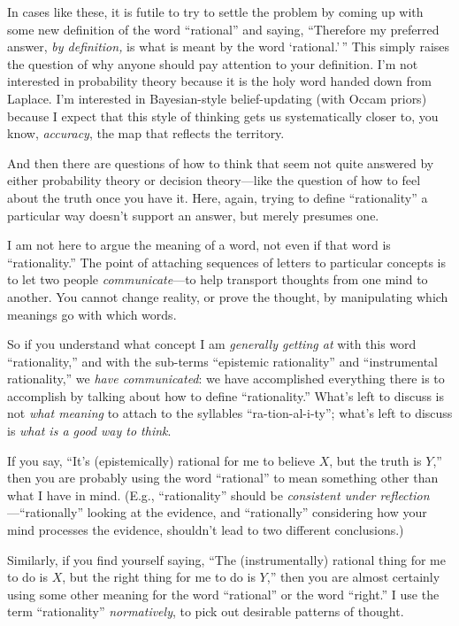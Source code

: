 {
 In cases like these, it is futile to try to settle the problem by
coming up with some new definition of the word
``rational'' and saying,
``Therefore my preferred answer, \textit{by
definition,} is what is meant by the word
`rational.'\,'' This
simply raises the question of why anyone should pay attention to your
definition. I'm not interested in probability theory
because it is the holy word handed down from Laplace.
I'm interested in Bayesian-style belief-updating (with
Occam priors) because I expect that this style of thinking gets us
systematically closer to, you know, \textit{accuracy}, the map that
reflects the territory.}

{
 And then there are questions of how to think that seem not quite
answered by either probability theory or decision theory---like the
question of how to feel about the truth once you have it. Here, again,
trying to define ``rationality'' a
particular way doesn't support an answer, but merely
presumes one.}

{
 I am not here to argue the meaning of a word, not even if that
word is ``rationality.'' The point
of attaching sequences of letters to particular concepts is to let two
people \textit{communicate}{}---to help transport thoughts from one
mind to another. You cannot change reality, or prove the thought, by
manipulating which meanings go with which words.}

{
 So if you understand what concept I am \textit{generally getting
at} with this word ``rationality,''
and with the sub-terms ``epistemic
rationality'' and ``instrumental
rationality,'' we \textit{have communicated}: we have
accomplished everything there is to accomplish by talking about how to
define ``rationality.''
What's left to discuss is not \textit{what meaning} to
attach to the syllables
``ra-tion-al-i-ty'';
what's left to discuss is \textit{what is a good way to
think}.}

{
 If you say, ``It's
(epistemically) rational for me to believe $X$, but the truth is
$Y$,'' then you are probably using the word
``rational'' to mean something other
than what I have in mind. (E.g.,
``rationality'' should be
\textit{consistent under
reflection}{}---``rationally''
looking at the evidence, and
``rationally'' considering how your
mind processes the evidence, shouldn't lead to two
different conclusions.)}

{
 Similarly, if you find yourself saying, ``The
(instrumentally) rational thing for me to do is $X$, but the right thing
for me to do is $Y$,'' then you are almost certainly
using some other meaning for the word
``rational'' or the word
``right.'' I use the term
``rationality''
\textit{normatively}, to pick out desirable patterns of thought.}

